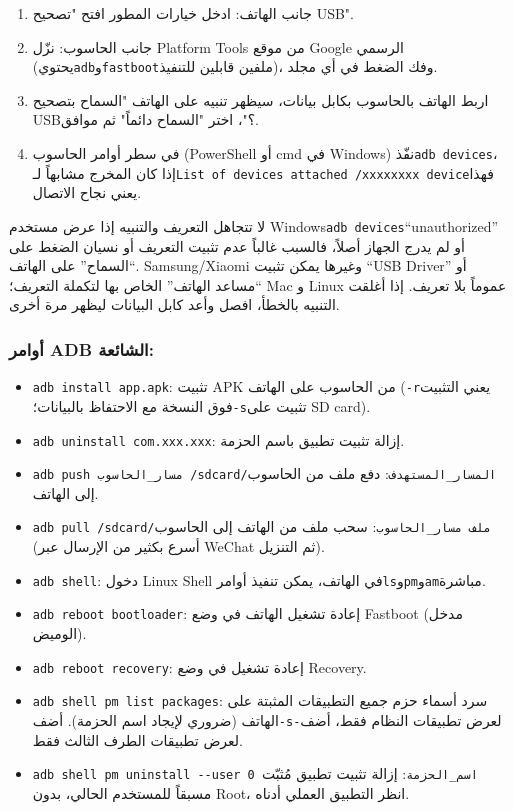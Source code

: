 \begin{enumerate}
  \item جانب الهاتف: ادخل خيارات المطور افتح "تصحيح USB".
  \item جانب الحاسوب: نزّل Platform Tools من موقع Google الرسمي (يحتوي\texttt{adb}و\texttt{fastboot}ملفين قابلين للتنفيذ)، وفك الضغط في أي مجلد.
  \item اربط الهاتف بالحاسوب بكابل بيانات، سيظهر تنبيه على الهاتف "السماح بتصحيح USB؟"، اختر "السماح دائماً" ثم موافق.
  \item في سطر أوامر الحاسوب (PowerShell أو cmd في Windows) نفّذ\texttt{adb devices}، إذا كان المخرج مشابهاً لـ\texttt{List of devices attached /\allowbreak  xxxxxxxx device}فهذا يعني نجاح الاتصال.
\end{enumerate}

\begin{tcbwarn}{لا تتجاهل التعريف والتنبيه}
إذا عرض مستخدم Windows\texttt{adb devices}“unauthorized” أو لم يدرج الجهاز أصلاً، فالسبب غالباً عدم تثبيت التعريف أو نسيان الضغط على “السماح” على الهاتف. Samsung/Xiaomi وغيرها يمكن تثبيت “USB Driver” أو “مساعد الهاتف” الخاص بها لتكملة التعريف؛ Mac و Linux عموماً بلا تعريف. إذا أغلقت التنبيه بالخطأ، افصل وأعد كابل البيانات ليظهر مرة أخرى.

\end{tcbwarn}

\subsubsection*{أوامر ADB الشائعة:}

\begin{itemize}
  \item \texttt{adb install app.\allowbreak apk}: تثبيت APK من الحاسوب على الهاتف (\texttt{-\allowbreak r}يعني التثبيت فوق النسخة مع الاحتفاظ بالبيانات؛\texttt{-\allowbreak s}تثبيت على SD card).
  \item \texttt{adb uninstall com.\allowbreak xxx.\allowbreak xxx}: إزالة تثبيت تطبيق باسم الحزمة.
  \item \texttt{adb push مسار\_الحاسوب /\allowbreak sdcard/\allowbreak المسار\_المستهدف}: دفع ملف من الحاسوب إلى الهاتف.
  \item \texttt{adb pull /\allowbreak sdcard/\allowbreak ملف مسار\_الحاسوب}: سحب ملف من الهاتف إلى الحاسوب (أسرع بكثير من الإرسال عبر WeChat ثم التنزيل).
  \item \texttt{adb shell}: دخول Linux Shell في الهاتف، يمكن تنفيذ أوامر\texttt{ls}و\texttt{pm}و\texttt{am}مباشرة.
  \item \texttt{adb reboot bootloader}: إعادة تشغيل الهاتف في وضع Fastboot (مدخل الوميض).
  \item \texttt{adb reboot recovery}: إعادة تشغيل في وضع Recovery.
  \item \texttt{adb shell pm list packages}: سرد أسماء حزم جميع التطبيقات المثبتة على الهاتف (ضروري لإيجاد اسم الحزمة). أضف\texttt{-\allowbreak s}لعرض تطبيقات النظام فقط، أضف\texttt{-}لعرض تطبيقات الطرف الثالث فقط.
  \item \texttt{adb shell pm uninstall -\allowbreak -\allowbreak user 0 اسم\_الحزمة}: إزالة تثبيت تطبيق مُثبّت مسبقاً للمستخدم الحالي، بدون Root، انظر التطبيق العملي أدناه.
\end{itemize}

